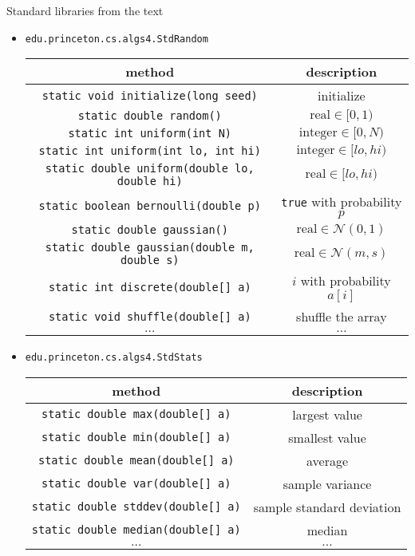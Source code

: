 \documentclass[8pt,a4paper,compress]{beamer}
\begin{document}
\begin{frame}[fragile]
\pause

Standard libraries from the text
\begin{itemize}
\item \lstinline{edu.princeton.cs.algs4.StdRandom}
\begin{center}
\begin{tabular}{cc}
method & description \\ \hline
\lstinline$static void initialize(long seed)$ & initialize \\
\lstinline$static double random()$ & $\text{real} \in [0, 1)$ \\
\lstinline$static int uniform(int N)$ & $\text{integer} \in [0, N)$ \\
\lstinline$static int uniform(int lo, int hi)$ & $\text{integer} \in [lo, hi)$ \\
\lstinline$static double uniform(double lo, double hi)$ & $\text{real} \in [lo, hi)$ \\
\lstinline$static boolean bernoulli(double p)$ & \lstinline$true$ with probability $p$ \\
\lstinline$static double gaussian()$ & $\text{real} \in \mathcal{N}(0, 1)$ \\
\lstinline$static double gaussian(double m, double s)$ & $\text{real} \in \mathcal{N}(m, s)$ \\
\lstinline$static int discrete(double[] a)$ & $i$ with probability $a[i]$ \\
\lstinline$static void shuffle(double[] a)$ & shuffle the array \\
$\dots$ & $\dots$ 
\end{tabular} 
\end{center}

\item \lstinline{edu.princeton.cs.algs4.StdStats}
\begin{center}
\begin{tabular}{cc}
method & description \\ \hline
\lstinline$static double max(double[] a)$ & largest value \\
\lstinline$static double min(double[] a)$ & smallest value \\
\lstinline$static double mean(double[] a)$ & average \\
\lstinline$static double var(double[] a)$ & sample variance \\
\lstinline$static double stddev(double[] a)$ & sample standard deviation \\
\lstinline$static double median(double[] a)$ & median \\
$\dots$ & $\dots$ 
\end{tabular} 
\end{center}
\end{itemize}
\end{frame}
\end{document}
